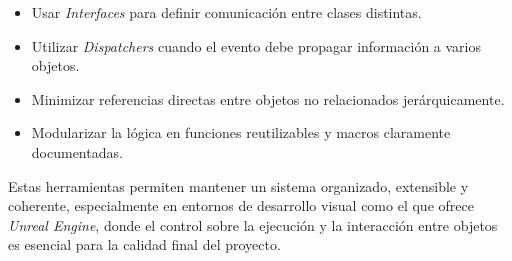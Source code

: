 \begin{itemize}
  \item Usar \textit{Interfaces} para definir comunicación entre clases distintas.
  \item Utilizar \textit{Dispatchers} cuando el evento debe propagar información a varios objetos.
  \item Minimizar referencias directas entre objetos no relacionados jerárquicamente.
  \item Modularizar la lógica en funciones reutilizables y macros claramente documentadas.
\end{itemize}

Estas herramientas permiten mantener un sistema organizado, extensible y coherente, especialmente en entornos de desarrollo visual como el que ofrece \textit{Unreal Engine}, donde el control sobre la ejecución y la interacción entre objetos es esencial para la calidad final del proyecto.
